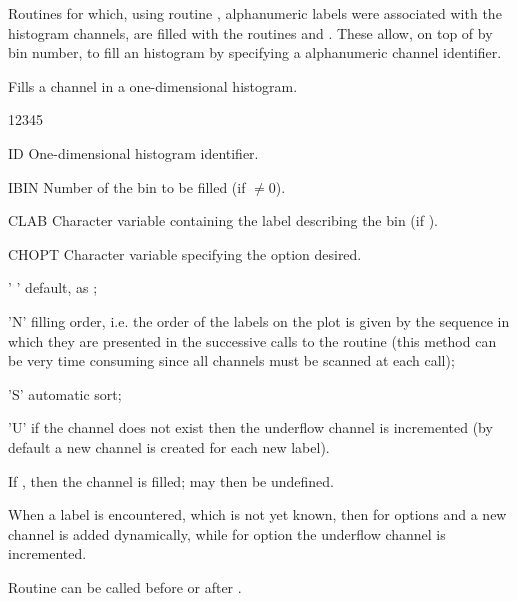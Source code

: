 Routines for which, using routine , alphanumeric 
labels were associated with the histogram channels, 
are filled with the routines  and .
These allow, on top of by bin number, 
to fill an histogram by specifying a alphanumeric channel identifier.


\Action Fills a channel in a one-dimensional histogram.

\begin{DLtt}{12345}
\item[ID]     One-dimensional histogram identifier.
\item[IBIN]   Number of the bin to be filled (if $\ne0$).
\item[CLAB]   Character variable containing the label 
              describing the bin (if ).
\item[CHOPT]  Character variable specifying the option desired.
              \begin{DLtt}{12}
                \item[' '] default, as ;
                \item['N'] filling order, i.e. the order of the labels on the
                           plot is given by the sequence in which they are
                           presented in the successive calls to the routine
                           (this method can be very time consuming since all
                           channels must be scanned at each call);
                \item['S'] automatic sort;
                \item['U'] if the channel does not exist 
                           then the underflow channel is incremented
                           (by default a new channel is created for each new label).
                \end{DLtt}
\end{DLtt}

\Remarks
\begin{UL}
\item If , then the channel 
      is filled;  may then be undefined.
\item When a label is encountered, which is not yet known, then for options  
      and  a new channel is added dynamically, while for option 
       the underflow channel is incremented.
\item Routine  can be called  before or after .
\end{UL}

